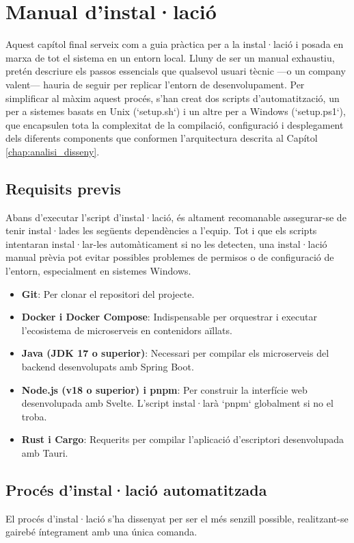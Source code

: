 \chapter{Manual d’instal·lació}
\label{chap:manual_instalacio}

Aquest capítol final serveix com a guia pràctica per a la instal·lació i posada en marxa de tot el sistema en un entorn local. Lluny de ser un manual exhaustiu, pretén descriure els passos essencials que qualsevol usuari tècnic —o un company valent— hauria de seguir per replicar l'entorn de desenvolupament. Per simplificar al màxim aquest procés, s'han creat dos scripts d'automatització, un per a sistemes basats en Unix (`setup.sh`) i un altre per a Windows (`setup.ps1`), que encapsulen tota la complexitat de la compilació, configuració i desplegament dels diferents components que conformen l'arquitectura descrita al Capítol \ref{chap:analisi_disseny}.

\section{Requisits previs}
Abans d'executar l'script d'instal·lació, és altament recomanable assegurar-se de tenir instal·lades les següents dependències a l'equip. Tot i que els scripts intentaran instal·lar-les automàticament si no les detecten, una instal·lació manual prèvia pot evitar possibles problemes de permisos o de configuració de l'entorn, especialment en sistemes Windows.

\begin{itemize}
    \item \textbf{Git}: Per clonar el repositori del projecte.
    \item \textbf{Docker i Docker Compose}: Indispensable per orquestrar i executar l'ecosistema de microserveis en contenidors aïllats.
    \item \textbf{Java (JDK 17 o superior)}: Necessari per compilar els microserveis del backend desenvolupats amb Spring Boot.
    \item \textbf{Node.js (v18 o superior) i pnpm}: Per construir la interfície web desenvolupada amb Svelte. L'script instal·larà `pnpm` globalment si no el troba.
    \item \textbf{Rust i Cargo}: Requerits per compilar l'aplicació d'escriptori desenvolupada amb Tauri.
\end{itemize}

\section{Procés d'instal·lació automatitzada}
El procés d'instal·lació s'ha dissenyat per ser el més senzill possible, realitzant-se gairebé íntegrament amb una única comanda.

